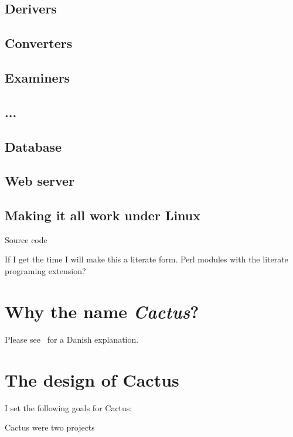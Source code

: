 \subsection{Derivers}

\subsection{Converters}

\subsection{Examiners}

\subsection{...}


\subsection{Database}

\subsection{Web server}

\subsection{Making it all work under Linux}
   
Source code

If I get the time I will make this a literate form. Perl
modules with the literate programing extension?


\section{Why the name \textit{Cactus}?}

Please see~ for a Danish explanation.



\section{The design of Cactus}
\label{sec:the-design-of-cactus}

I set the following goals for Cactus:

Cactus were two projects

